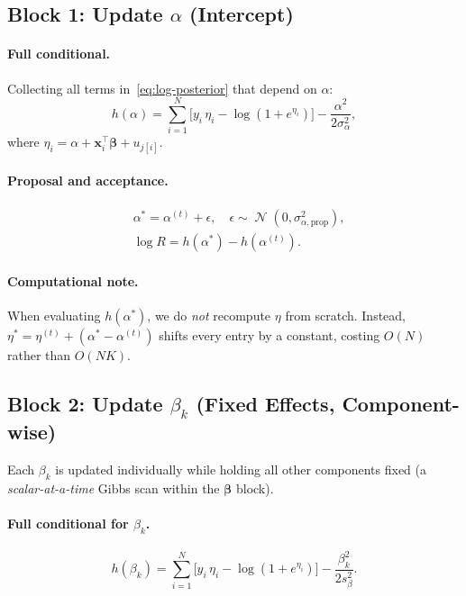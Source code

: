 \documentclass[11pt]{article}
\newcommand{\bx}{\bm{x}}
\newcommand{\bbeta}{\bm{\beta}}
\DeclareMathOperator{\Normal}{\mathcal{N}}
\begin{document}
\subsection{Block 1: Update $\alpha$ (Intercept)}
\label{sec:block-alpha}

\paragraph{Full conditional.}
Collecting all terms in~\eqref{eq:log-posterior} that depend on $\alpha$:
\begin{equation}\label{eq:fc-alpha}
  h(\alpha) = \sum_{i=1}^{N}
    \bigl[y_i\,\eta_i - \log(1+e^{\eta_i})\bigr]
  - \frac{\alpha^2}{2\sigma_\alpha^2},
\end{equation}
where $\eta_i = \alpha + \bx_i^\top\bbeta + u_{j[i]}$.

\paragraph{Proposal and acceptance.}
\begin{align}
  &\alpha^* = \alpha^{(t)} + \epsilon, \quad \epsilon \sim \Normal(0,\sigma_{\alpha,\text{prop}}^2), \label{eq:prop-alpha}\\
  &\log R = h(\alpha^*) - h(\alpha^{(t)}). \label{eq:ar-alpha}
\end{align}

\paragraph{Computational note.}
When evaluating $h(\alpha^*)$, we do \emph{not} recompute $\eta$
from scratch. Instead, $\eta^* = \eta^{(t)} + (\alpha^* - \alpha^{(t)})$
shifts every entry by a constant, costing $O(N)$ rather than $O(NK)$.

\subsection{Block 2: Update $\beta_k$ (Fixed Effects, Component-wise)}
\label{sec:block-beta}

Each $\beta_k$ is updated individually while holding all other
components fixed (a \emph{scalar-at-a-time} Gibbs scan within the
$\bbeta$ block).

\paragraph{Full conditional for $\beta_k$.}
\begin{equation}\label{eq:fc-beta}
  h(\beta_k) = \sum_{i=1}^{N}
    \bigl[y_i\,\eta_i - \log(1+e^{\eta_i})\bigr]
  - \frac{\beta_k^2}{2s_\beta^2}.
\end{equation}
\end{document}
